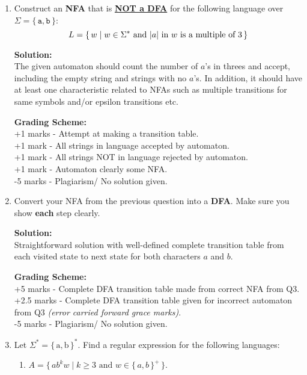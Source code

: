 \documentclass[11pt, article, oneside]{memoir}
\newcommand{\set}[1]{\{\, #1\, \}}
\DeclarePairedDelimiter\abs{\lvert}{\rvert}
\begin{document}
\begin{enumerate}
    \item
        Construct an \textbf{NFA} that is \textbf{\underline{NOT a DFA}} for the following language over \(\Sigma = \set{\texttt{a}, \texttt{b}}\):
        \[
            L = \set{w \mid w \in \Sigma^* \text{ and }
            \text{\(\abs{a}\) in \(w\) is a multiple of \(3\)}}
        \]
        
        \textbf{Solution:}
        \\The given automaton should count the number of \(a\)'s in threes and accept, including the empty string and strings with no \(a\)'s. In addition, it should have at least one characteristic related to NFAs such as multiple transitions for same symbols and/or epsilon transitions etc.

        \textbf{Grading Scheme:}
        \\+1 marks - Attempt at making a transition table.
        \\+1 mark - All strings in language accepted by automaton.
        \\+1 mark - All strings NOT in language rejected by automaton.
        \\+1 mark - Automaton clearly some NFA.
        \\-5 marks -  Plagiarism/ No solution given.
        
    \item
        Convert your NFA from the previous question into a \textbf{DFA}. Make sure you show \textbf{each} step clearly.

        \textbf{Solution:}
        \\Straightforward solution with well-defined complete transition table from each visited state to next state for both characters \(a\) and \(b\).

        \textbf{Grading Scheme:}
        \\+5 marks - Complete DFA transition table made from correct NFA from Q3.
        \\+2.5 marks - Complete DFA transition table given for incorrect automaton from Q3 \textit{(error carried forward grace marks)}.
        \\-5 marks -  Plagiarism/ No solution given.
        
    \item
        Let \(\Sigma^* = \set{\text{a}, \text{b}}^*\). Find a regular expression for the following languages:
        \begin{enumerate}
            \item
                \(A = \set{ab^kw \mid k \ge 3 \text{ and } w \in \set{a, b}^+}\).
        

\end{enumerate}
\end{enumerate}
\end{document}
